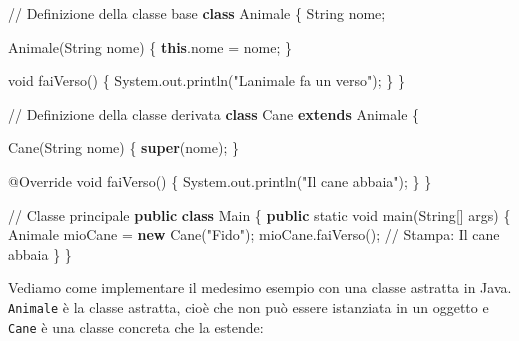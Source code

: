 \documentclass[
  letterpaper,
  DIV=11,
  numbers=noendperiod]{scrreprt}
\newenvironment{Shaded}{\begin{snugshade}}{\end{snugshade}}
\newcommand{\AttributeTok}[1]{\textcolor[rgb]{0.40,0.45,0.13}{#1}}
\newcommand{\BuiltInTok}[1]{\textcolor[rgb]{0.00,0.23,0.31}{#1}}
\newcommand{\CommentTok}[1]{\textcolor[rgb]{0.37,0.37,0.37}{#1}}
\newcommand{\DataTypeTok}[1]{\textcolor[rgb]{0.68,0.00,0.00}{#1}}
\newcommand{\FunctionTok}[1]{\textcolor[rgb]{0.28,0.35,0.67}{#1}}
\newcommand{\KeywordTok}[1]{\textcolor[rgb]{0.00,0.23,0.31}{\textbf{#1}}}
\newcommand{\NormalTok}[1]{\textcolor[rgb]{0.00,0.23,0.31}{#1}}
\newcommand{\OperatorTok}[1]{\textcolor[rgb]{0.37,0.37,0.37}{#1}}
\newcommand{\StringTok}[1]{\textcolor[rgb]{0.13,0.47,0.30}{#1}}
\begin{document}
\begin{Shaded}
\begin{Highlighting}[]
\CommentTok{// Definizione della classe base}
\KeywordTok{class}\NormalTok{ Animale }\OperatorTok{\{}
    \BuiltInTok{String}\NormalTok{ nome}\OperatorTok{;}

    \FunctionTok{Animale}\OperatorTok{(}\BuiltInTok{String}\NormalTok{ nome}\OperatorTok{)} \OperatorTok{\{}
        \KeywordTok{this}\OperatorTok{.}\FunctionTok{nome} \OperatorTok{=}\NormalTok{ nome}\OperatorTok{;}
    \OperatorTok{\}}

    \DataTypeTok{void} \FunctionTok{faiVerso}\OperatorTok{()} \OperatorTok{\{}
        \BuiltInTok{System}\OperatorTok{.}\FunctionTok{out}\OperatorTok{.}\FunctionTok{println}\OperatorTok{(}\StringTok{"L\textquotesingle{}animale fa un verso"}\OperatorTok{);}
    \OperatorTok{\}}
\OperatorTok{\}}

\CommentTok{// Definizione della classe derivata}
\KeywordTok{class}\NormalTok{ Cane }\KeywordTok{extends}\NormalTok{ Animale }\OperatorTok{\{}

    \FunctionTok{Cane}\OperatorTok{(}\BuiltInTok{String}\NormalTok{ nome}\OperatorTok{)} \OperatorTok{\{}
        \KeywordTok{super}\OperatorTok{(}\NormalTok{nome}\OperatorTok{);}
    \OperatorTok{\}}

    \AttributeTok{@Override}
    \DataTypeTok{void} \FunctionTok{faiVerso}\OperatorTok{()} \OperatorTok{\{}
        \BuiltInTok{System}\OperatorTok{.}\FunctionTok{out}\OperatorTok{.}\FunctionTok{println}\OperatorTok{(}\StringTok{"Il cane abbaia"}\OperatorTok{);}
    \OperatorTok{\}}
\OperatorTok{\}}

\CommentTok{// Classe principale}
\KeywordTok{public} \KeywordTok{class}\NormalTok{ Main }\OperatorTok{\{}
    \KeywordTok{public} \DataTypeTok{static} \DataTypeTok{void} \FunctionTok{main}\OperatorTok{(}\BuiltInTok{String}\OperatorTok{[]}\NormalTok{ args}\OperatorTok{)} \OperatorTok{\{}
\NormalTok{        Animale mioCane }\OperatorTok{=} \KeywordTok{new} \FunctionTok{Cane}\OperatorTok{(}\StringTok{"Fido"}\OperatorTok{);}
\NormalTok{        mioCane}\OperatorTok{.}\FunctionTok{faiVerso}\OperatorTok{();} \CommentTok{// Stampa: Il cane abbaia}
    \OperatorTok{\}}
\OperatorTok{\}}
\end{Highlighting}
\end{Shaded}

Vediamo come implementare il medesimo esempio con una classe astratta in
Java. \texttt{Animale} è la classe astratta, cioè che non può essere
istanziata in un oggetto e \texttt{Cane} è una classe concreta che la
estende:
\end{document}
